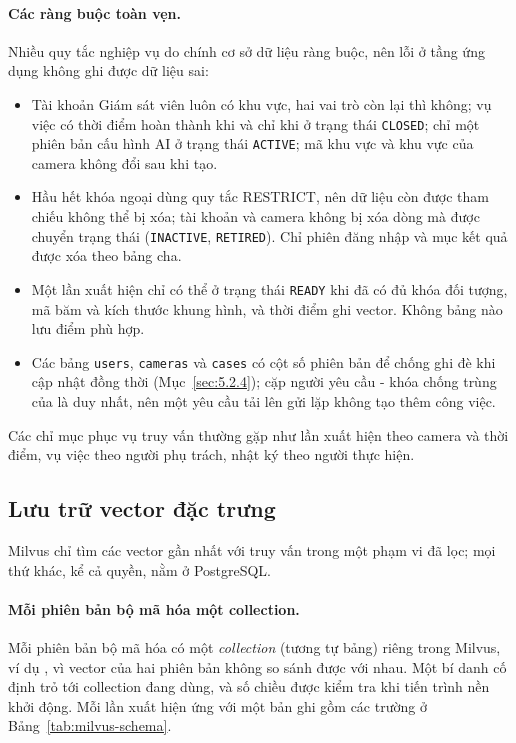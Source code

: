 \paragraph{Các ràng buộc toàn vẹn.} Nhiều quy tắc nghiệp vụ do chính cơ sở dữ liệu ràng buộc, nên lỗi ở tầng ứng dụng không ghi được dữ liệu sai:
\begin{itemize}
    \item Tài khoản Giám sát viên luôn có khu vực, hai vai trò còn lại thì không; vụ việc có thời điểm hoàn thành khi và chỉ khi ở trạng thái \texttt{CLOSED}; chỉ một phiên bản cấu hình AI ở trạng thái \texttt{ACTIVE}; mã khu vực và khu vực của camera không đổi sau khi tạo.
    \item Hầu hết khóa ngoại dùng quy tắc RESTRICT, nên dữ liệu còn được tham chiếu không thể bị xóa; tài khoản và camera không bị xóa dòng mà được chuyển trạng thái (\texttt{INACTIVE}, \texttt{RETIRED}). Chỉ phiên đăng nhập và mục kết quả được xóa theo bảng cha.
    \item Một lần xuất hiện chỉ có thể ở trạng thái \texttt{READY} khi đã có đủ khóa đối tượng, mã băm và kích thước khung hình, và thời điểm ghi vector. Không bảng nào lưu điểm phù hợp.
    \item Các bảng \texttt{users}, \texttt{cameras} và \texttt{cases} có cột số phiên bản để chống ghi đè khi cập nhật đồng thời (Mục~\ref{sec:5.2.4}); cặp người yêu cầu - khóa chống trùng của  là duy nhất, nên một yêu cầu tải lên gửi lặp không tạo thêm công việc.
\end{itemize}
Các chỉ mục phục vụ truy vấn thường gặp như lần xuất hiện theo camera và thời điểm, vụ việc theo người phụ trách, nhật ký theo người thực hiện.

\subsection{Lưu trữ vector đặc trưng}
\label{sec:5.3.2}

Milvus chỉ tìm các vector gần nhất với truy vấn trong một phạm vi đã lọc; mọi thứ khác, kể cả quyền, nằm ở PostgreSQL.

\paragraph{Mỗi phiên bản bộ mã hóa một collection.} Mỗi phiên bản bộ mã hóa có một \emph{collection} (tương tự bảng) riêng trong Milvus, ví dụ , vì vector của hai phiên bản không so sánh được với nhau. Một bí danh cố định trỏ tới collection đang dùng, và số chiều được kiểm tra khi tiến trình nền khởi động. Mỗi lần xuất hiện ứng với một bản ghi gồm các trường ở Bảng~\ref{tab:milvus-schema}.

